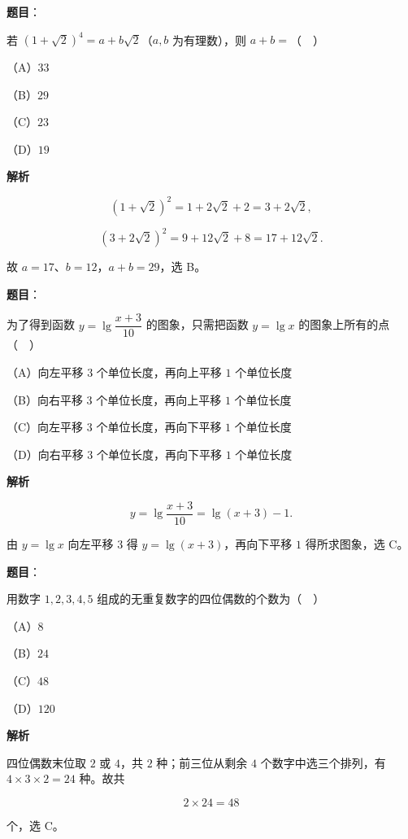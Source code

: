 \begin{answer}

\textbf{题目}：

若 $(1+\sqrt2)^4=a+b\sqrt2$（$a,b$ 为有理数），则 $a+b=$（　）

（A）$33$

（B）$29$

（C）$23$

（D）$19$

\textbf{解析}

\nopagebreak[4]
\[(1+\sqrt2)^2=1+2\sqrt2+2=3+2\sqrt2,\]

\nopagebreak[4]
\[(3+2\sqrt2)^2=9+12\sqrt2+8=17+12\sqrt2 .\]

故 $a=17$、$b=12$，$a+b=29$，选 B。


\end{answer}
\begin{answer}

\textbf{题目}：

为了得到函数 $y=\lg\dfrac{x+3}{10}$ 的图象，只需把函数 $y=\lg x$ 的图象上所有的点（　）

（A）向左平移 $3$ 个单位长度，再向上平移 $1$ 个单位长度

（B）向右平移 $3$ 个单位长度，再向上平移 $1$ 个单位长度

（C）向左平移 $3$ 个单位长度，再向下平移 $1$ 个单位长度

（D）向右平移 $3$ 个单位长度，再向下平移 $1$ 个单位长度

\textbf{解析}

\nopagebreak[4]
\[y=\lg\frac{x+3}{10}=\lg(x+3)-1 .\]

由 $y=\lg x$ 向左平移 $3$ 得 $y=\lg(x+3)$，再向下平移 $1$ 得所求图象，选 C。


\end{answer}
\begin{answer}

\textbf{题目}：

用数字 $1,2,3,4,5$ 组成的无重复数字的四位偶数的个数为（　）

（A）$8$

（B）$24$

（C）$48$

（D）$120$

\textbf{解析}

四位偶数末位取 $2$ 或 $4$，共 $2$ 种；前三位从剩余 $4$ 个数字中选三个排列，有 $4\times3\times2=24$ 种。故共

\nopagebreak[4]
\[2\times24=48\]

个，选 C。


\end{answer}

